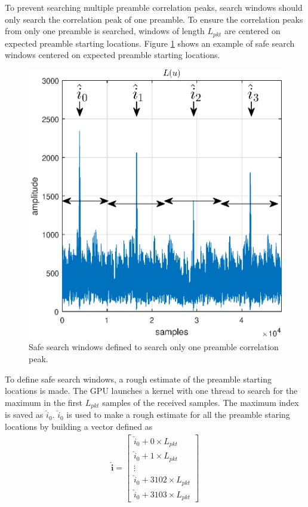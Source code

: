 To prevent searching multiple preamble correlation peaks, search windows should only search the correlation peak of one preamble.
To ensure the correlation peaks from only one preamble is searched, windows of length $ L_{pkt} $ are centered on expected preamble starting locations.
Figure \ref{fig:L_windows} shows an example of safe search windows centered on expected preamble starting locations.
\begin{figure}
	\centering\includegraphics[width=5in]{figures/gpu/L_windows.eps}
	\caption{Safe search windows defined to search only one preamble correlation peak.}
	\label{fig:L_windows}
\end{figure}

To define safe search windows, a rough estimate of the preamble starting locations is made.
The GPU launches a kernel with one thread to search for the maximum in the first $ L_{pkt} $ samples of the received samples.
The maximum index is saved as $\hat{i}_0$.
$\hat{i}_0$ is used to make a rough estimate for all the preamble staring locations by building a vector defined as
\begin{align}
\hat{\mathbf{i}}
=     
\begin{bmatrix}
\hat{i}_0 + 0\times L_{pkt}  			\\
\hat{i}_0 + 1\times L_{pkt}  		\\
\vdots			\\
\hat{i}_0 + 3102\times L_{pkt}  		\\
\hat{i}_0 + 3103\times L_{pkt}  		
\end{bmatrix}
\label{eq:preamble_det_i_hat}
\end{align}

